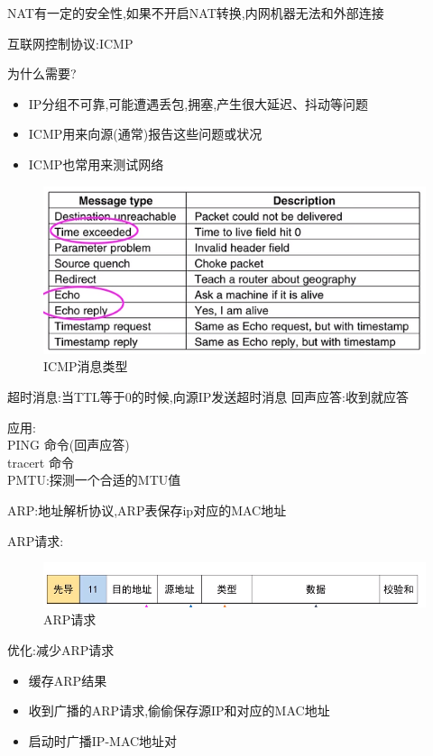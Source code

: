 \documentclass[UTF8,a4paper]{ctexart}
\begin{document}
NAT有一定的安全性,如果不开启NAT转换,内网机器无法和外部连接

互联网控制协议:ICMP

为什么需要?
\begin{itemize}
  \item IP分组不可靠,可能遭遇丢包,拥塞,产生很大延迟、抖动等问题
  \item ICMP用来向源(通常)报告这些问题或状况
  \item ICMP也常用来测试网络
\end{itemize}

\begin{figure}[H]
  \centering
  \includegraphics[scale = 0.3]{assets/jisuanjiwangluo_28625.png}
  \caption{ICMP消息类型}
\end{figure}

超时消息:当TTL等于0的时候,向源IP发送超时消息
回声应答:收到就应答

应用:\\
PING 命令(回声应答)\\
tracert 命令\\
PMTU:探测一个合适的MTU值

ARP:地址解析协议,ARP表保存ip对应的MAC地址

ARP请求:
\begin{figure}[H]
  \centering
  \includegraphics[scale = 0.3]{assets/jisuanjiwangluo_cf6b0.png}
  \caption{ARP请求}
\end{figure}

优化:减少ARP请求
\begin{itemize}
  \item 缓存ARP结果
  \item 收到广播的ARP请求,偷偷保存源IP和对应的MAC地址
  \item 启动时广播IP-MAC地址对
\end{itemize}
\end{document}
